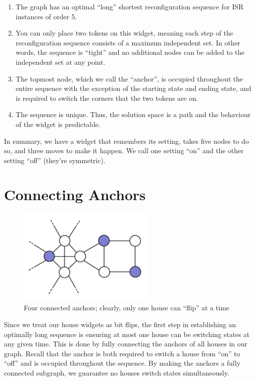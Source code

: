 \documentclass{article}
\begin{document}
\begin{enumerate}
\item The graph has an optimal ``long'' shortest reconfiguration sequence for ISR instances of order 5. 
\item You can only place two tokens on this widget, meaning each step of the reconfiguration sequence consists of a maximum independent set. In other words, the sequence is ``tight'' and no additional nodes can be added to the independent set at any point.
\item  The topmost node, which we call the ``anchor'', is occupied throughout the entire sequence with the exception of the starting state and ending state, and is required to switch the corners that the two tokens are on.
\item The sequence is unique. Thus, the solution space is a path and the behaviour of the widget is predictable.
\end{enumerate}

In summary, we have a widget that remembers its setting, takes five nodes to do so, and three moves to make it happen. We call one setting ``on'' and the other setting ``off'' (they're symmetric).


\section{Connecting Anchors}

\begin{figure}[ht]
\centering
\includegraphics[width=0.6\textwidth]{connected-anchors.jpg}
\caption{\label{fig:connected-anchors}Four connected anchors; clearly, only one house can ``flip'' at a time}
\end{figure}

Since we treat our house widgets as bit flips, the first step in establishing an optimally long sequence is ensuring at most one house can be switching states at any given time. This is done by fully connecting the anchors of all houses in our graph. Recall that the anchor is both required to switch a house from ``on'' to ``off'' and is occupied throughout the sequence. By making the anchors a fully connected subgraph, we guarantee no houses switch states simultaneously.
\end{document}
